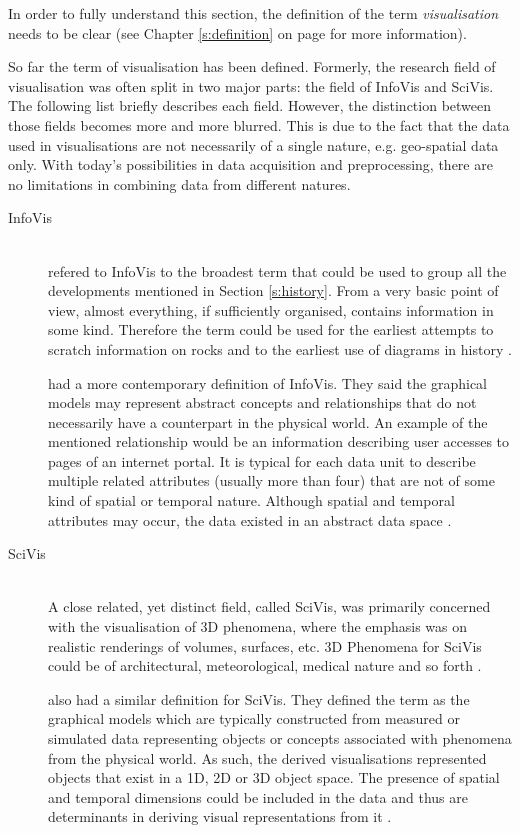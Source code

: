 \cbstart
In order to fully understand this section, the definition of the term \textit{visualisation} needs to be clear (see Chapter \ref{s:definition} on page \pageref{s:definition} for more information).

So far the term of visualisation has been defined. Formerly, the research field of visualisation was often split in two major parts: the field of \ac{InfoVis} and \ac{SciVis}. The following list briefly describes each field. However, the distinction between those fields becomes more and more blurred. This is due to the fact that the data used in visualisations are not necessarily of a single nature, e.g. geo-spatial data only. With today's possibilities in data acquisition and preprocessing, there are no limitations in combining data from different natures.

\begin{description}

\item[\acl{InfoVis}] \hfill \\
\citeauthor{Friendly.2001} refered to \ac{InfoVis} to the broadest term that could be used to group all the developments mentioned in Section \ref{s:history}. From a very basic point of view, almost everything, if sufficiently organised, contains information in some kind. Therefore the term could be used for the earliest attempts to scratch information on rocks and to the earliest use of diagrams in history .

\citeauthor{Ferreira2003} had a more contemporary definition of \ac{InfoVis}. They said the graphical models may represent abstract concepts and relationships that do not necessarily have a counterpart in the physical world. An example of the mentioned relationship would be an information describing user accesses to pages of an internet portal. It is typical for each data unit to describe multiple related attributes (usually more than four) that are not of some kind of spatial or temporal nature. Although spatial and temporal attributes may occur, the data existed in an abstract data space .
\newpage
\item[\acl{SciVis}] \hfill \\
A close related, yet distinct field, called \ac{SciVis}, was primarily concerned with the visualisation of 3D phenomena, where the emphasis was on realistic renderings of volumes, surfaces, etc. 3D Phenomena for \ac{SciVis} could be of architectural, meteorological, medical nature and so forth .

\citeauthor{Ferreira2003} also had a similar definition for \ac{SciVis}. They defined the term as the graphical models which are typically constructed from measured or simulated data representing objects or concepts associated with phenomena from the physical world. As such, the derived visualisations represented objects that exist in a 1D, 2D or 3D object space. The presence of spatial and temporal dimensions could be included in the data and thus are determinants in deriving visual representations from it .
\end{description}

